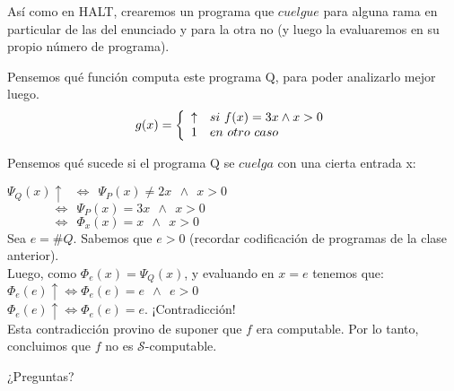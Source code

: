 \documentclass[compress]{beamer}
\newcommand{\bigpause}{\bigskip \pause}
\begin{document}
\begin{frame}
As\'i como en HALT, crearemos un programa que $cuelgue$ para alguna rama en particular de las del enunciado y para la otra no (y luego la evaluaremos en su propio n\'umero de programa).%
\bigpause

\end{frame}

\begin{frame}
Pensemos qu\'e funci\'on computa este programa Q, para poder analizarlo mejor luego.
\bigpause
{} {
$$g(x) = \left\{
\begin{array}{c l}
 \uparrow & si\ f(x) = 3x \wedge x > 0\\
 1 & en\ otro\ caso
\end{array}
\right.
$$
}

\end{frame}

\begin{frame}

Pensemos qu\'e sucede si el programa Q se $cuelga$ con una cierta entrada x:

$\Psi_Q(x) \uparrow \ \ \ \Leftrightarrow  \ \   \Psi_P(x) \neq 2x \ \ \wedge \ \ x > 0 $ \\
$\ \ \ \ \ \ \ \ \ \ \ \ \ \ \ \ \Leftrightarrow  \ \   \Psi_P(x) = 3x \ \ \wedge \ \ x > 0 $ \\
$\ \ \ \ \ \ \ \ \ \ \ \ \ \ \ \ \Leftrightarrow  \ \   \Phi_x(x) = x \ \ \wedge \ \ x > 0 $ \\

\bigpause
Sea $e = \#Q$. Sabemos que $e > 0$ (recordar codificaci\'on de programas de la clase anterior). \\

\bigpause
Luego, como $\Phi_e(x) = \Psi_Q(x)$, y evaluando en $x = e$ tenemos que: \\

\bigpause
$\Phi_e(e) \uparrow \Leftrightarrow \Phi_e(e) = e \ \ \wedge \ \ e > 0 $ \\
$\Phi_e(e) \uparrow \Leftrightarrow \Phi_e(e) = e $. ¡Contradicci\'on! \\

Esta contradicci\'on provino de suponer que $f$ era computable. Por lo tanto, concluimos que $f$ no es $\mathcal{S}$-computable.
\end{frame}

\begin{frame}
\begin{center}
\Huge ¿Preguntas? %
\end{center}
\end{frame}
\end{document}
